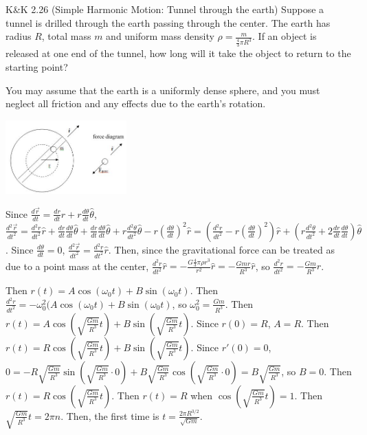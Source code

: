 \documentclass{esg8012pset}
\begin{document}
\begin{problem}{K\&K 2.26 (Simple Harmonic Motion: Tunnel through the earth)}
  Suppose a tunnel is drilled through the earth passing through the center. The earth has radius $R$, total mass $m$ and uniform mass density $\rho = \frac{m}{\frac{4}{3}\pi R^3}$.  If an object is released at one end of the tunnel, how long will it take the object to return to the starting point?

  You may assume that the earth is a uniformly dense sphere, and you must neglect all friction and any effects due to the earth's rotation.
  \begin{center}\includegraphics[width=0.35\textwidth]{ps03_2}\end{center}
\end{problem}
\begin{solution}
  Since $\frac{d \vec r}{d t} = \frac{d r}{d t}\hat r + r\frac{d \theta}{d t}\hat\theta$, $\frac{d^2 \vec r}{d t^2} = \frac{d^2 r}{d t^2}\hat r + \frac{d r}{d t}\frac{d \theta}{d t}\hat \theta + \frac{d r}{d t}\frac{d \theta}{d t}\hat\theta + r\frac{d^2 \theta}{d t^2}\hat\theta - r\left(\frac{d \theta}{d t}\right)^2\hat r = \left(\frac{d^2 r}{d t^2}- r\left(\frac{d \theta}{d t}\right)^2\right)\hat r + \left(r\frac{d^2 \theta}{d t^2} + 2\frac{d r}{d t}\frac{d \theta}{d t}\right)\hat \theta$.  Since $\frac{d \theta}{d t} = 0$, $\frac{d^2 \vec r}{d t^2} =  \frac{d^2 r}{d t^2}\hat r$.  Then, since the gravitational force can be treated as due to a point mass at the center, $\frac{d^2 r}{d t^2}\hat r = -\frac{G \frac{4}{3}\pi \rho r^3}{r^2} \hat r = -\frac{G m r}{R^3} \hat r$, so $\frac{d^2 r}{d t^2} = -\frac{G m}{R^3}r$.

  Then $r(t) = A\cos(\omega_0 t) + B\sin(\omega_0 t)$.  Then $\frac{d^2 r}{d t^2} = -\omega_0^2(A\cos(\omega_0 t) + B\sin(\omega_0 t)$, so $\omega_0^2 = \frac{G m}{R^3}$.  Then $r(t) = A\cos\left(\sqrt{\frac{G m}{R^3}} t\right) + B\sin\left(\sqrt{\frac{G m}{R^3}} t\right)$.  Since $r(0) = R$, $A = R$.  Then $r(t) = R\cos\left(\sqrt{\frac{G m}{R^3}} t\right) + B\sin\left(\sqrt{\frac{G m}{R^3}} t\right)$.  Since $r'(0) = 0$, $0 = -R\sqrt{\frac{G m}{R^3}}\sin\left(\sqrt{\frac{G m}{R^3}} \cdot 0\right) + B\sqrt{\frac{G m}{R^3}}\cos\left(\sqrt{\frac{G m}{R^3}} \cdot 0\right) = B\sqrt{\frac{G m}{R^3}}$, so $B = 0$.  Then $r(t) = R\cos\left(\sqrt{\frac{G m}{R^3}} t\right)$.  Then $r(t) = R$ when $\cos\left(\sqrt{\frac{G m}{R^3}} t\right) = 1$.  Then $\sqrt{\frac{G m}{R^3}} t = 2\pi n$.  Then, the first time is $t = \frac{2\pi R^{3/2}}{\sqrt{G m}}$.
\end{solution}
\end{document}
